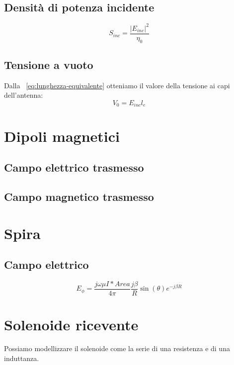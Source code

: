 \documentclass[10pt,a4paper]{report}
\begin{document}
			\subsection{Densità di potenza incidente}

			\[
			S_{inc}=\frac{|E_{inc}|^2}{\eta_0}	
			\]

			\subsection{Tensione a vuoto}			
				Dalla ~\ref{eq:lunghezza-equivalente} otteniamo il valore della tensione ai capi dell'antenna:
				\begin{equation}
				V_0=E_{inc}l_e
				\end{equation}



			

		\section{Dipoli magnetici}
			
			\subsection{Campo elettrico trasmesso}

			\subsection{Campo magnetico trasmesso}

		\section{Spira}

			\subsection{Campo elettrico}

				\begin{equation}
				E_\phi=\frac{j\omega\mu I*Area}{4\pi}\frac{j\beta}{R}\sin(\theta)e^{-j\beta R}
				\end{equation}

		\section{Solenoide ricevente}
			
			Possiamo modellizzare il solenoide come la serie di una resistenza e di una induttanza.
\end{document}
